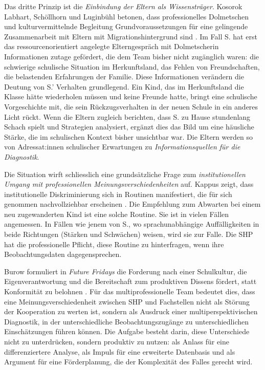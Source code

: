 \documentclass[ngerman, a4paper]{article}
\begin{document}
Das dritte Prinzip ist die \textit{Einbindung der Eltern als Wissensträger}.
Kosorok Labhart, Schöllhorn und Luginbühl betonen, dass professionelles
Dolmetschen und kulturvermittelnde Begleitung Grundvoraussetzungen für eine
gelingende Zusammenarbeit mit Eltern mit Migrationshintergrund sind
\parencite{kosoroklabhart2021voneltern}. Im Fall S. hat erst das
ressourcenorientiert angelegte Elterngespräch mit Dolmetscherin Informationen
zutage gefördert, die dem Team bisher nicht zugänglich waren: die schwierige
schulische Situation im Herkunftsland, das Fehlen von Freundschaften, die
belastenden Erfahrungen der Familie. Diese Informationen verändern die
Deutung von S.' Verhalten grundlegend. Ein Kind, das im Herkunftsland die
Klasse hätte wiederholen müssen und keine Freunde hatte, bringt eine
schulische Vorgeschichte mit, die sein Rückzugsverhalten in der neuen Schule
in ein anderes Licht rückt. Wenn die Eltern zugleich berichten, dass S. zu
Hause stundenlang Schach spielt und Strategien analysiert, ergänzt dies das
Bild um eine häusliche Stärke, die im schulischen Kontext bisher unsichtbar
war. Die Eltern werden so von Adressat:innen schulischer Erwartungen zu
\textit{Informationsquellen für die Diagnostik}.

Die Situation wirft schliesslich eine grundsätzliche Frage zum
\textit{institutionellen Umgang mit professionellen Meinungsverschiedenheiten}
auf. Kappus zeigt, dass institutionelle Diskriminierung sich in Routinen
manifestiert, die für sich genommen nachvollziehbar erscheinen
\parencite{kappus2010migration}. Die Empfehlung zum Abwarten bei einem
neu zugewanderten Kind ist eine solche Routine. Sie ist in vielen Fällen
angemessen. In Fällen wie jenem von S., wo sprachunabhängige Auffälligkeiten
in beide Richtungen (Stärken und Schwächen) weisen, wird sie zur Falle.
Die SHP hat die professionelle Pflicht, diese Routine zu hinterfragen, wenn
ihre Beobachtungsdaten dagegensprechen.

Burow formuliert in \textit{Future Fridays} die Forderung nach einer
Schulkultur, die Eigenverantwortung und die Bereitschaft zum produktiven
Dissens fördert, statt Konformität zu belohnen \parencite{burow2020future}.
Für das multiprofessionelle Team bedeutet dies, dass eine Meinungsverschiedenheit
zwischen SHP und Fachstellen nicht als Störung der Kooperation zu werten ist,
sondern als Ausdruck einer multiperspektivischen Diagnostik, in der
unterschiedliche Beobachtungszugänge zu unterschiedlichen Einschätzungen
führen können. Die Aufgabe besteht darin, diese Unterschiede nicht zu
unterdrücken, sondern produktiv zu nutzen: als Anlass für eine differenziertere
Analyse, als Impuls für eine erweiterte Datenbasis und als Argument für eine
Förderplanung, die der Komplexität des Falles gerecht wird.
\end{document}
